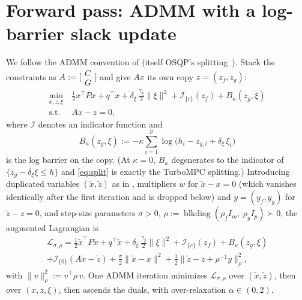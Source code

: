 \documentclass[10pt,twocolumn]{article}
\newcommand{\blkdiag}{\operatorname{blkdiag}}
\newcommand{\half}{\tfrac{1}{2}}
\begin{document}
\section{Forward pass: ADMM with a log-barrier slack update}
\label{sec:forward}

We follow the ADMM convention of \cite{turbompc} (itself OSQP's
splitting~\cite{osqp,boyd}). Stack the constraints as
$A := \bigl[\begin{smallmatrix}C\\ G\end{smallmatrix}\bigr]$ and give $Ax$ its own
copy $z = (z_f, z_g)$:
\begin{equation}
\label{eq:split}
\begin{aligned}
\min_{x,z,\xi}\ & \half x^\top Px + q^\top x
+ \delta_\xi\,\frac{\gamma_\xi}{2}\|\xi\|^2
+ \mathcal I_{\{c\}}(z_f) + B_\kappa(z_g,\xi)\\
\text{s.t.}\ & Ax - z = 0,
\end{aligned}
\end{equation}
where $\mathcal I$ denotes an indicator function and
\begin{equation}
\label{eq:Bkappa}
B_\kappa(z_g,\xi) :=
-\kappa\sum_{i=1}^{p}\log\bigl(h_i - z_{g,i} + \delta_\xi\,\xi_i\bigr)
\end{equation}
is the log barrier on the copy. (At $\kappa = 0$, $B_\kappa$ degenerates to the
indicator of $\{z_g - \delta_\xi\xi \le h\}$ and \eqref{eq:split} is exactly the
TurboMPC splitting.) Introducing duplicated variables
$(\tilde x, \tilde z)$ as in \cite{turbompc}, multipliers $w$ for
$\tilde x - x = 0$ (which vanishes identically after the first iteration and is
dropped below) and $y = (y_f, y_g)$ for $\tilde z - z = 0$, and step-size parameters
$\sigma > 0$, $\rho := \blkdiag(\rho_f I_m,\ \rho_g I_p)\succ 0$, the augmented
Lagrangian is
\begin{multline}
\label{eq:auglag}
\mathcal L_{\sigma,\rho}
= \half\tilde x^\top P\tilde x + q^\top\tilde x
+ \delta_\xi\,\frac{\gamma_\xi}{2}\|\xi\|^2
+ \mathcal I_{\{c\}}(z_f) + B_\kappa(z_g,\xi)\\
+ \mathcal I_{\{0\}}(A\tilde x - \tilde z)
+ \frac{\sigma}{2}\bigl\|\tilde x - x\bigr\|^2
+ \half\bigl\|\tilde z - z + \rho^{-1}y\bigr\|_\rho^2 ,
\end{multline}
with $\|v\|_\rho^2 := v^\top\rho\, v$. One ADMM iteration minimizes
$\mathcal L_{\sigma,\rho}$ over $(\tilde x,\tilde z)$, then over $(x, z, \xi)$, then
ascends the duals, with over-relaxation $\alpha\in(0,2)$.
\end{document}
